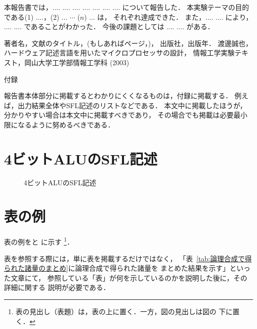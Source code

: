 \documentclass{jarticle}[11pt]
\newcommand{\tabref}[1]{\makebox{表~\ref{#1}}}
\begin{document}
本報告書では，.... .... .... .... .... .... .... について報告した．
本実験テーマの目的である(1) ....，(2) ... $\cdots$ ($n$) ... は，
それぞれ達成できた．
また，.... .... により， .... .... であることがわかった．
今後の課題としては .... .... がある．

\begin{thebibliography}{99}
 著者名，文献のタイトル，(もしあればページ，)，
出版社，出版年．
渡邊誠也，ハードウェア記述言語を用いたマイクロプロセッサの設計，
情報工学実験テキスト，岡山大学工学部情報工学科 (2003)
\end{thebibliography}


\newpage
\appendix

\noindent
{\Large \gt 付録}

報告書本体部分に掲載するとわかりにくくなるものは，付録に掲載する．
例えば，出力結果全体やSFL記述のリストなどである．
本文中に掲載したほうが，分かりやすい場合は本文中に掲載すべきであり，
その場合でも掲載は必要最小限になるように努めるべきである．

\section{4ビットALUのSFL記述}
\label{appsec:4ビットALUのSFL記述}

\begin{figure}[hbtp]
\begin{center}

\caption{4ビットALUのSFL記述}
\label{fig:4ビットALUのSFL記述}
\end{center}
\end{figure}

\section{表の例}

表の例を\tabref{tab:論理合成で得られた諸量のまとめ}と
\tabref{tab:マイクロプロセッサp16の設計状況}に示す
\footnote{表の見出し（表題）は，表の上に置く．一方，図の見出しは図の
下に置く．}．

表を参照する際には，単に表を掲載するだけではなく，
「表~\ref{tab:論理合成で得られた諸量のまとめ}に論理合成で得られた諸量を
まとめた結果を示す」といった文章にて，
参照している「表」が何を示しているのかを説明した後に，その詳細に関する
説明が必要である．
\end{document}
